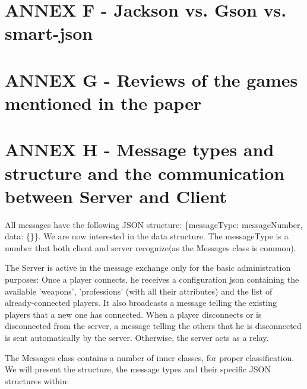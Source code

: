 \documentclass{article}
\begin{document}
\section{ANNEX F - Jackson vs. Gson vs. smart-json}

\section{ANNEX G - Reviews of the games mentioned in the paper}

\section{ANNEX H - Message types and structure and the communication between
Server and Client}

All messages have the following JSON structure: \{messageType: messageNumber,
data: \{\}\}. We are now interested in the data structure. The messageType is a
number that both client and server recognize(as the Messages class is
common).\newline

The Server is active in the message exchange only for the basic administration
purposes: Once a player connects, he receives a configuration json containing
the available 'weapons', 'professions' (with all their attributes) and the list
of already-connected players. It also broadcasts a message telling the existing
players that a new one has connected. When a player disconnects or is
disconnected from the server, a message telling the others that he is
disconnected is sent automatically by the server. Otherwise, the server acts as
a relay.\newline

The Messages class contains a number of inner classes, for proper
classification. We will present the structure, the message types and their
specific JSON structures within:
\end{document}
